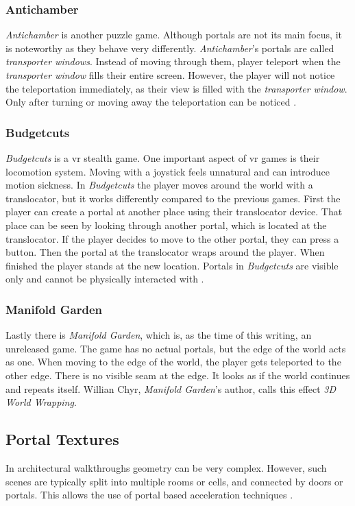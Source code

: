 \subsubsection{Antichamber}
\textit{Antichamber} is another puzzle game. Although portals are not its main focus, it is noteworthy as they behave very differently. \textit{Antichamber}'s portals are called \textit{transporter windows}. Instead of moving through them, player teleport when the \textit{transporter window} fills their entire screen. However, the player will not notice the teleportation immediately, as their view is filled with the \textit{transporter window}. Only after turning or moving away the teleportation can be noticed \cite{antichamber}.

\subsubsection{Budgetcuts}
\textit{Budgetcuts} is a \gls{vr} stealth game. One important aspect of \gls{vr} games is their locomotion system. Moving with a joystick feels unnatural and can introduce motion sickness. In \textit{Budgetcuts} the player moves around the world with a translocator, but it works differently compared to the previous games. First the player can create a portal at another place using their translocator device. That place can be seen by looking through another portal, which is located at the translocator. If the player decides to move to the other portal, they can press a button. Then the portal at the translocator wraps around the player. When finished the player stands at the new location. Portals in \textit{Budgetcuts} are visible only and cannot be physically interacted with \cite{budgetcuts, gdc:budgetcuts}.

\subsubsection{Manifold Garden}
Lastly there is \textit{Manifold Garden}, which is, as the time of this writing, an unreleased game. The game has no actual portals, but the edge of the world acts as one. When moving to the edge of the world, the player gets teleported to the other edge. There is no visible seam at the edge. It looks as if the world continues and repeats itself. Willian Chyr, \textit{Manifold Garden}'s author, calls this effect \textit{3D World Wrapping}.

\subsection{Portal Textures}
In architectural walkthroughs geometry can be very complex. However, such scenes are typically split into multiple rooms or cells, and connected by doors or portals. This allows the use of portal based acceleration techniques \cite{aliaga:1997:architectural}.

